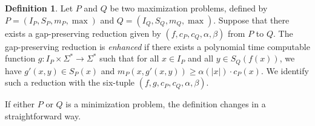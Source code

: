\documentclass[]{article}
\theoremstyle{plain}
\theoremstyle{definition}
\newtheorem{definition}{Definition}
\begin{document}
\begin{definition}
  Let $P$ and $Q$ be two maximization problems, defined by $P = (I_P, S_P, m_P, \max)$ and $Q = (I_Q, S_Q, m_Q, \max)$.
  Suppose that there exists a gap-preserving reduction given by $(f, c_P, c_Q, \alpha, \beta)$ from $P$ to $Q$.
  The gap-preserving reduction is \emph{enhanced} if there exists a polynomial time computable function $g \colon I_P \times \Sigma^* \to \Sigma^*$ such that for all $x \in I_P$ and all $y \in S_Q(f(x))$, we have $g'(x, y) \in S_P(x)$ and $m_P(x, g'(x, y)) \geq \alpha(|x|) \cdot c_P(x)$.
  We identify such a reduction with the six-tuple $(f, g, c_P, c_Q, \alpha, \beta)$.

  If either $P$ or $Q$ is a minimization problem, the definition changes in a straightforward way.
\end{definition}
\end{document}
